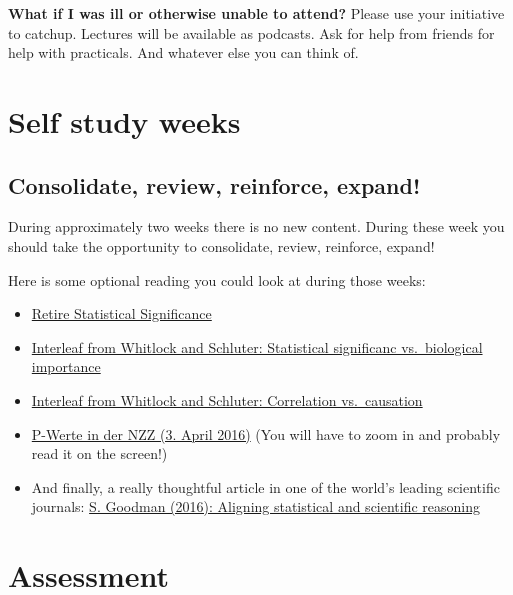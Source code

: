 \documentclass[
  letterpaper,
  8pt,
  a4paper]{book}
\providecommand{\tightlist}{%
  \setlength{\itemsep}{0pt}\setlength{\parskip}{0pt}}
\begin{document}
\textbf{What if I was ill or otherwise unable to attend?} Please use
your initiative to catchup. Lectures will be available as podcasts. Ask
for help from friends for help with practicals. And whatever else you
can think of.

\section*{Self study weeks}\label{self-study-weeks}


\subsection*{Consolidate, review, reinforce,
expand!}\label{consolidate-review-reinforce-expand}

During approximately two weeks there is no new content. During these
week you should take the opportunity to consolidate, review, reinforce,
expand!

Here is some optional reading you could look at during those weeks:

\begin{itemize}
\tightlist
\item
  \href{Amrhein_etal2019.pdf}{Retire Statistical Significance}
\item
  \href{significanceVSimportance_Whitlock.pdf}{Interleaf from Whitlock
  and Schluter: Statistical significanc vs.~biological importance}
\item
  \href{correlationVScausation.pdf}{Interleaf from Whitlock and
  Schluter: Correlation vs.~causation}
\item
  \href{NZZ_April2016.pdf}{P-Werte in der NZZ (3. April 2016)} (You will
  have to zoom in and probably read it on the screen!)
\item
  And finally, a really thoughtful article in one of the world's leading
  scientific journals: \href{Goodman_2016_Science.pdf}{S. Goodman
  (2016): Aligning statistical and scientific reasoning}
\end{itemize}

\section*{Assessment}\label{assessment}
\end{document}
